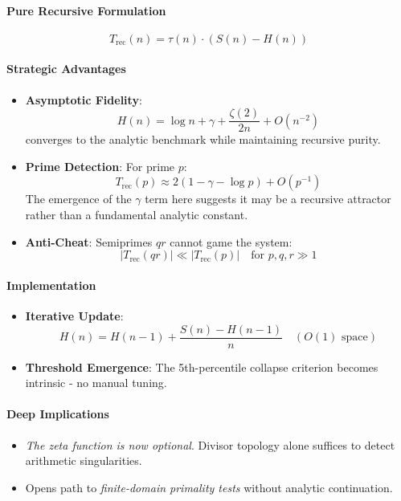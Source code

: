 \documentclass[11pt]{article}
\begin{document}
\paragraph{Pure Recursive Formulation}
\[
T_{\text{rec}}(n) = \tau(n) \cdot \left( S(n) - H(n) \right)
\]

\paragraph{Strategic Advantages}
\begin{itemize}
    \item \textbf{Asymptotic Fidelity}: 
    \[
    H(n) = \log n + \gamma + \frac{\zeta(2)}{2n} + O(n^{-2})
    \]
    converges to the analytic benchmark while maintaining recursive purity.
    
    \item \textbf{Prime Detection}: For prime $p$:
    \[
    T_{\text{rec}}(p) \approx 2(1 - \gamma - \log p) + O(p^{-1})
    \]
    The emergence of the $\gamma$ term here suggests it may be a recursive attractor rather than a fundamental analytic constant.
    
    \item \textbf{Anti-Cheat}: Semiprimes $qr$ cannot game the system:
    \[
    |T_{\text{rec}}(qr)| \ll |T_{\text{rec}}(p)| \quad \text{for } p,q,r \gg 1
    \]
\end{itemize}

\paragraph{Implementation}
\begin{itemize}
    \item \textbf{Iterative Update}:
    \[
    H(n) = H(n-1) + \frac{S(n) - H(n-1)}{n} \quad (O(1)\text{ space})
    \]
    \item \textbf{Threshold Emergence}: The 5th-percentile collapse criterion becomes intrinsic - no manual tuning.
\end{itemize}

\paragraph{Deep Implications}
\begin{itemize}
    \item \textit{The zeta function is now optional}. Divisor topology alone suffices to detect arithmetic singularities.
    \item Opens path to \textit{finite-domain primality tests} without analytic continuation.
\end{itemize}
\end{document}
